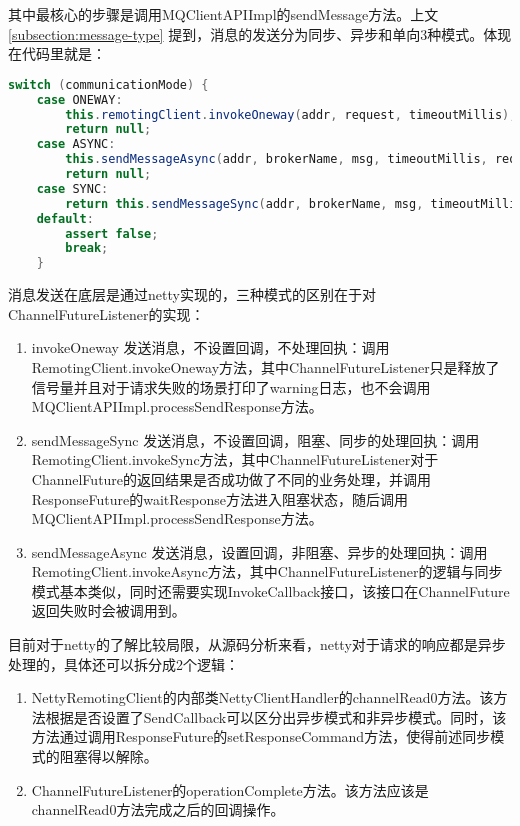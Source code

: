 其中最核心的步骤是调用MQClientAPIImpl的sendMessage方法。上文 \ref{subsection:message-type} 提到，消息的发送分为同步、异步和单向3种模式。体现在代码里就是：
\begin{lstlisting}[language=Java, style=customStyleJavaLight]
switch (communicationMode) {
    case ONEWAY:
        this.remotingClient.invokeOneway(addr, request, timeoutMillis);
        return null;
    case ASYNC:
        this.sendMessageAsync(addr, brokerName, msg, timeoutMillis, request, sendCallback);
        return null;
    case SYNC:
        return this.sendMessageSync(addr, brokerName, msg, timeoutMillis, request);
    default:
        assert false;
        break;
    }
\end{lstlisting}

消息发送在底层是通过netty实现的，三种模式的区别在于对ChannelFutureListener的实现：
\begin{enumerate}[itemindent=1em]
\item invokeOneway 发送消息，不设置回调，不处理回执：调用RemotingClient.invokeOneway方法，其中ChannelFutureListener只是释放了信号量并且对于请求失败的场景打印了warning日志，也不会调用MQClientAPIImpl.processSendResponse方法。
\item sendMessageSync 发送消息，不设置回调，阻塞、同步的处理回执：调用RemotingClient.invokeSync方法，其中ChannelFutureListener对于ChannelFuture的返回结果是否成功做了不同的业务处理，并调用ResponseFuture的waitResponse方法进入阻塞状态，随后调用MQClientAPIImpl.processSendResponse方法。
\item sendMessageAsync 发送消息，设置回调，非阻塞、异步的处理回执：调用RemotingClient.invokeAsync方法，其中ChannelFutureListener的逻辑与同步模式基本类似，同时还需要实现InvokeCallback接口，该接口在ChannelFuture返回失败时会被调用到。
\end{enumerate}

目前对于netty的了解比较局限，从源码分析来看，netty对于请求的响应都是异步处理的，具体还可以拆分成2个逻辑：
\begin{enumerate}[itemindent=1em]
\item NettyRemotingClient的内部类NettyClientHandler的channelRead0方法。该方法根据是否设置了SendCallback可以区分出异步模式和非异步模式。同时，该方法通过调用ResponseFuture的setResponseCommand方法，使得前述同步模式的阻塞得以解除。
\item ChannelFutureListener的operationComplete方法。该方法应该是channelRead0方法完成之后的回调操作。
\end{enumerate}





